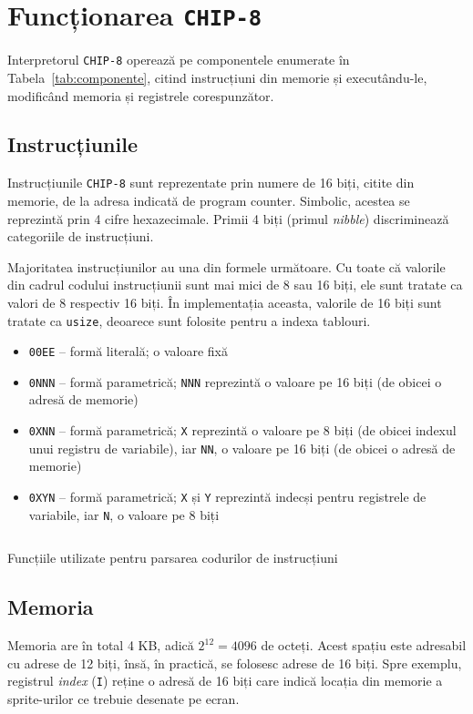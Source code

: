\documentclass[a4paper]{article}
\begin{document}
\section{Funcționarea \texttt{CHIP-8}}
Interpretorul \texttt{CHIP-8} operează pe componentele enumerate în Tabela~\ref{tab:componente}, citind instrucțiuni din memorie și executându-le,
modificând memoria și registrele corespunzător.

\subsection{Instrucțiunile}
Instrucțiunile \texttt{CHIP-8} sunt reprezentate prin numere de 16 biți, citite din memorie, de la adresa indicată de program counter. Simbolic,
acestea se reprezintă prin 4 cifre hexazecimale. Primii 4 biți (primul \textit{nibble}) discriminează categoriile de instrucțiuni.

Majoritatea instrucțiunilor au una din formele următoare. Cu toate că valorile din cadrul codului instrucțiunii sunt mai mici de 8 sau 16 biți, ele
sunt tratate ca valori de 8 respectiv 16 biți. În implementația aceasta, valorile de 16 biți sunt tratate ca \texttt{usize}, deoarece sunt folosite
pentru a indexa tablouri.
\begin{itemize}
	\item \texttt{00EE} -- formă literală; o valoare fixă
	\item \texttt{0NNN} -- formă parametrică; \texttt{NNN} reprezintă o valoare pe 16 biți (de obicei o adresă de memorie)
	\item \texttt{0XNN} -- formă parametrică; \texttt{X} reprezintă o valoare pe 8 biți (de obicei indexul unui registru de variabile), iar \texttt{NN}, o valoare pe 16 biți (de obicei o adresă de memorie)
	\item \texttt{0XYN} -- formă parametrică; \texttt{X} și \texttt{Y} reprezintă indecși pentru registrele de variabile, iar \texttt{N}, o valoare pe 8 biți
\end{itemize}

\begin{listing}[ht!]
	\inputminted{rust}{codeblocks/opcodes.rs}
	\caption{Funcțiile utilizate pentru parsarea codurilor de instrucțiuni}
	\label{listing:xyn}
\end{listing}

\pagebreak

\subsection{Memoria}
Memoria are în total 4 KB, adică $2^{12} = 4096$ de octeți. Acest spațiu este adresabil cu adrese de 12 biți, însă, în practică, se folosesc adrese de 16 biți.
Spre exemplu, registrul \textit{index} (\texttt{I}) reține o adresă de 16 biți care indică locația din memorie a sprite-urilor ce trebuie desenate pe ecran.
\end{document}
